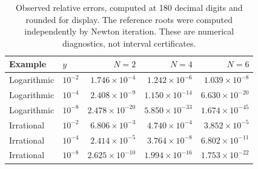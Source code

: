 \begin{table}[htbp]
\centering
\small
\begin{tabular}{@{}llrrr@{}}
\toprule
Example & $y$ & $N=2$ & $N=4$ & $N=6$\\
\midrule
Logarithmic & $10^{-2}$ & $1.746\times10^{-4}$ & $1.242\times10^{-6}$ & $1.039\times10^{-8}$ \\
Logarithmic & $10^{-4}$ & $2.408\times10^{-9}$ & $1.150\times10^{-14}$ & $6.630\times10^{-20}$ \\
Logarithmic & $10^{-8}$ & $2.478\times10^{-20}$ & $5.850\times10^{-33}$ & $1.674\times10^{-45}$ \\
Irrational & $10^{-2}$ & $6.806\times10^{-3}$ & $4.740\times10^{-4}$ & $3.852\times10^{-5}$ \\
Irrational & $10^{-4}$ & $2.414\times10^{-5}$ & $3.764\times10^{-8}$ & $6.802\times10^{-11}$ \\
Irrational & $10^{-8}$ & $2.625\times10^{-10}$ & $1.994\times10^{-16}$ & $1.753\times10^{-22}$ \\
\bottomrule
\end{tabular}
\caption{Observed relative errors, computed at 180 decimal digits and rounded for display. The reference roots were computed independently by Newton iteration. These are numerical diagnostics, not interval certificates.}
\label{tab:numeric}
\end{table}
